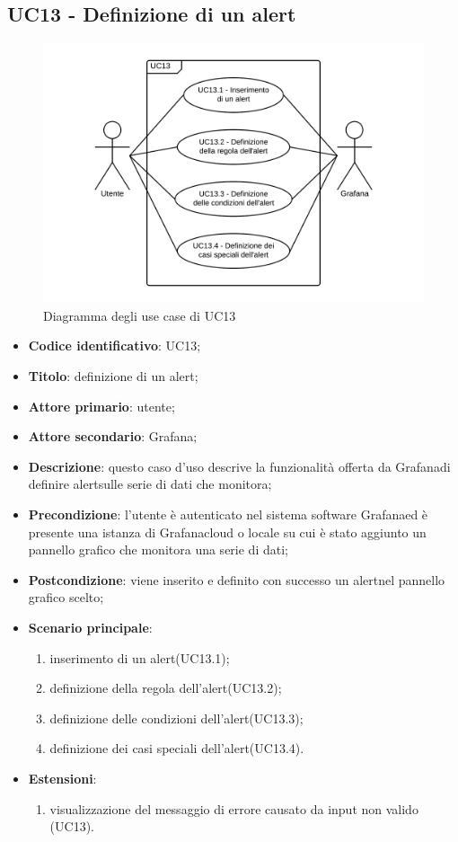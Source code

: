 \subsection{UC13 - Definizione di un alert}
\begin{figure}[H]
\includegraphics{img/UC13_-_Definizione_di_un_alert.png}
\caption{Diagramma degli use case di UC13}
\end{figure}
\begin{itemize}
	\item \textbf{Codice identificativo}: UC13;
	\item \textbf{Titolo}: definizione di un alert\glo;
	\item \textbf{Attore primario}: utente;
	\item \textbf{Attore secondario}: Grafana\glo;
	\item \textbf{Descrizione}: questo caso d'uso descrive la funzionalità offerta da Grafana\glosp di definire alert\glosp sulle serie di dati che monitora;
	\item \textbf{Precondizione}: l'utente è autenticato nel sistema software Grafana\glosp ed è presente una istanza di Grafana\glosp cloud o locale su cui è stato aggiunto un pannello grafico che monitora una serie di dati;
	\item \textbf{Postcondizione}: viene inserito e definito con successo un alert\glosp nel pannello grafico scelto;
	\item \textbf{Scenario principale}: 
	\begin{enumerate}
		\item inserimento di un alert\glosp (UC13.1);
		\item definizione della regola dell'alert\glosp (UC13.2);
		\item definizione delle condizioni dell'alert\glosp (UC13.3);
		\item definizione dei casi speciali dell'alert\glosp (UC13.4).
	\end{enumerate}

	\item \textbf{Estensioni}:	
	\begin{enumerate}
		\item visualizzazione del messaggio di errore causato da input non valido (UC13).
	\end{enumerate}
\end{itemize}


